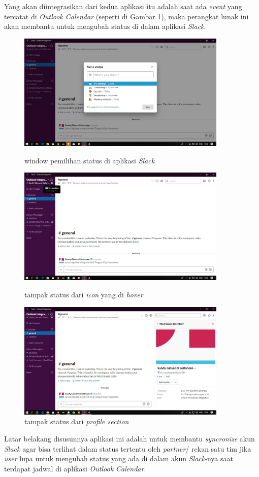 \documentclass[a4paper,twoside]{article}
\begin{document}
Yang akan diintegrasikan dari kedua aplikasi itu adalah saat ada \textit{event} yang tercatat di \textit{Outlook Calendar} (seperti di Gambar 1), maka perangkat lunak ini akan membantu untuk mengubah status di dalam aplikasi \textit{Slack}.
\begin{figure}[h!]
\begin{center}
  \includegraphics[width=10cm]{img/slack_1.jpg}
  \caption{window pemilihan status di aplikasi \textit{Slack}}
  \includegraphics[width=10cm]{img/slack_2.jpg}
  \caption{tampak status dari \textit{icon} yang di \textit{hover}}
  \includegraphics[width=10cm]{img/slack_3.jpg}
  \caption{tampak status dari \textit{profile section}}
\end{center}
\end{figure}
\clearpage

Latar belakang disusunnya aplikasi ini adalah untuk membantu \textit{syncronize} akun \textit{Slack} agar bisa terlihat dalam status tertentu oleh \textit{partner}/ rekan satu tim jika \textit{user} lupa untuk mengubah status yang ada di dalam akun \textit{Slack}-nya saat terdapat jadwal di aplikasi \textit{Outlook Calendar}. 
\end{document}
